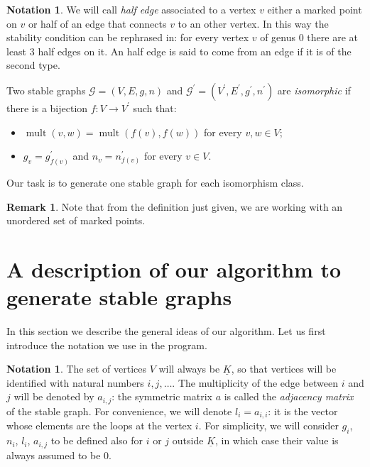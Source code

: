 \documentclass{amsart}
\theoremstyle{plain}
\theoremstyle{definition}
\newtheorem{remark}[theorem]{Remark}
\newtheorem{notation}[theorem]{Notation}
\DeclareMathOperator{\mult}{mult}
\newcommand{\graph}{\mathcal{G}}
\newcommand{\ubar}[1]{\underline{#1}}
\begin{document}
\begin{notation} We will call \emph{half edge} associated to a vertex $v$
either a marked point on $v$ or half of an edge that connects $v$ to an
other vertex. In this way the stability condition can be rephrased in: for
every vertex $v$ of genus $0$ there are at least $3$ half edges on it.
An half edge is said to come from an edge if it is of the second type.
\end{notation}

Two stable graphs $\graph = (V, E, g, n)$ and $\graph^\prime =
(V^\prime, E^\prime, g^\prime, n^\prime)$ are \emph{isomorphic\/} if
there is a bijection $f\colon V \to V^\prime$ such that:
\begin{itemize}
\item $\mult(v, w) = \mult(f(v), f(w))$ for every $v, w \in V$;
\item $g_v = g^\prime_{f(v)}$ and $n_v = n^\prime_{f(v)}$ for every $v
  \in V$.
\end{itemize}
Our task is to generate one stable graph for each isomorphism class.

\begin{remark}
  Note that from the definition just given, we are working with an
  unordered set of marked points.
\end{remark}



\section{A description of our algorithm to generate stable graphs}

In this section we describe the general ideas of our algorithm. Let us
first introduce the notation we use in the program.

\begin{notation}\label{not:gnla}
  The set of vertices $V$ will always be $\ubar{K}$, so that vertices
  will be identified with natural numbers $i, j, \dots$. The
  multiplicity of the edge between $i$ and $j$ will be denoted by
  $a_{i,j}$: the symmetric matrix $a$ is called the \emph{adjacency
    matrix} of the stable graph. For convenience, we will denote $l_i
  = a_{i,i}$: it is the vector whose elements are the loops at the
  vertex $i$. For simplicity, we will consider $g_i$, $n_i$, $l_i$,
  $a_{i,j}$ to be defined also for $i$ or $j$ outside $\ubar{K}$, in
  which case their value is always assumed to be $0$.
\end{notation}
\end{document}
